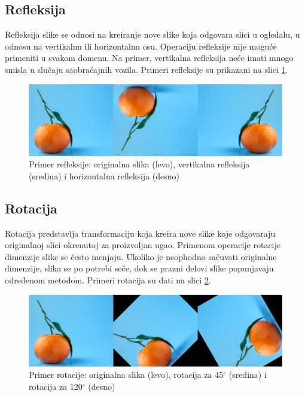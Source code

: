 \documentclass[12pt,oneside]{memoir}
\begin{document}
\subsection{Refleksija}
Refleksija slike se odnosi na kreiranje nove slike koja odgovara slici u ogledalu, u odnosu na vertikalnu ili horizontalnu osu. Operaciju refleksije nije moguće primeniti u svakom domenu. Na primer, vertikalna refleksija neće imati mnogo smisla u slučaju saobraćajnih vozila. Primeri refleksije su prikazani na slici \ref{fig:section3_flip}. 

\begin{figure}[ht]
    \centering
    \includegraphics[width=1\textwidth]{matfmaster/glava3/flip.jpg}
    \caption{Primer refleksije: originalna slika (levo), vertikalna refleksija (sredina) i horizontalna refleksija (desno) \cite{unsplashOrange}}
    \label{fig:section3_flip}
\end{figure}

\subsection{Rotacija}
Rotacija predstavlja transformaciju koja kreira nove slike koje odgovaraju originalnoj slici okrenutoj za proizvoljan ugao. Primenom operacije rotacije dimenzije slike se često menjaju. Ukoliko je neophodno sačuvati originalne dimenzije, slika se po potrebi seče, dok se prazni delovi slike popunjavaju određenom metodom. Primeri rotacija su dati na slici \ref{fig:section3_rot}. 

\begin{figure}[ht]
    \centering
    \includegraphics[width=1\textwidth]{matfmaster/glava3/rotate.jpg}
    \caption{Primer rotacije: originalna slika (levo), rotacija za 45\(^\circ\) (sredina) i  rotacija za 120\(^\circ\) (desno) \cite{unsplashOrange}}
    \label{fig:section3_rot}
\end{figure}
\end{document}
